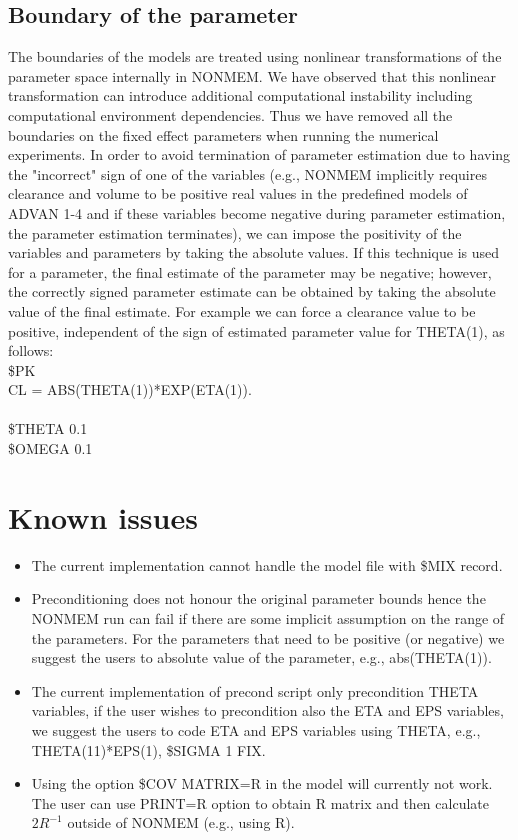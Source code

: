 \subsection{Boundary of the parameter} \label{app::abs}
The boundaries of the models are treated using nonlinear transformations of the parameter space internally in NONMEM.  We have observed that this nonlinear transformation can introduce additional computational instability including computational environment dependencies. Thus we have removed all the boundaries on the fixed effect parameters when running the numerical experiments.
In order to avoid  termination of  parameter estimation due to having the "incorrect" sign of one of the variables (e.g., NONMEM implicitly requires clearance and volume to be positive real values in the predefined models of ADVAN 1-4 and if these variables become negative during  parameter estimation, the parameter estimation terminates), we can impose the positivity of the variables and parameters by taking the absolute values.  If this technique is used for a parameter, the final estimate of the parameter may be negative; however, the correctly signed parameter estimate can be obtained by taking the absolute value of the final estimate.  For example we can force a clearance value to be positive, independent of the sign of estimated parameter value for THETA(1), as follows:\\
\$PK\\
CL     = ABS(THETA(1))*EXP(ETA(1)).\\
\\
\$THETA 0.1\\
\$OMEGA 0.1\\

\section{Known issues}

\begin{itemize}
    \item The current implementation cannot handle the model file with \$MIX record.

    \item Preconditioning does not honour the original parameter bounds hence the NONMEM run can fail if there are some implicit assumption on the range of the parameters.  For the parameters that need to be positive (or negative) we suggest the users to absolute value of the parameter, e.g., abs(THETA(1)).

    \item The current implementation of precond script only precondition THETA variables, if the user wishes to precondition also the ETA and EPS variables, we suggest the users to code ETA and EPS variables using THETA, e.g., THETA(11)*EPS(1), \$SIGMA 1 FIX.

    \item Using the option \$COV MATRIX=R in the model will currently not work.  The user can use PRINT=R option to obtain R matrix and then calculate $2R^{-1}$ outside of NONMEM (e.g., using R).
\end{itemize}

